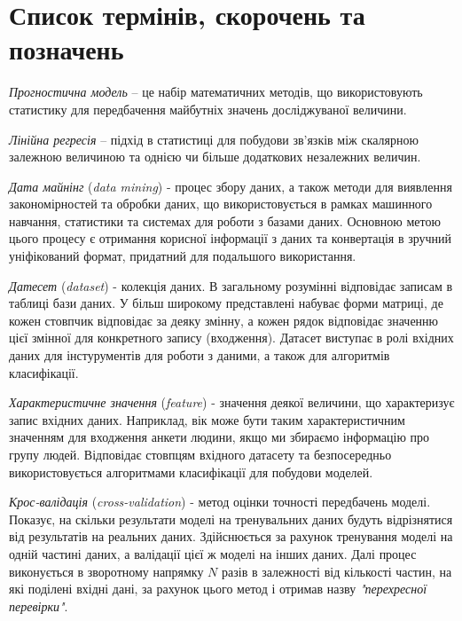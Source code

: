 \section{Список термінів, скорочень та позначень}

\textit{Прогностична модель} – це набір математичних методів, що використовують статистику для передбачення майбутніх значень досліджуваної величини. 

\textit{Лінійна регресія} – підхід в статистиці для побудови зв’язків між скалярною залежною величиною та однією чи більше додаткових незалежних величин.

\textit{Дата майнінг} (\textit{data mining}) - процес збору даних, а також методи для виявлення закономірностей та обробки даних, що використовується в рамках машинного навчання, статистики та системах для роботи з базами даних. Основною метою цього процесу є отримання корисної інформації з даних та конвертація в зручний уніфікований формат, придатний для подальшого використання.

\textit{Датесет} (\textit{dataset}) - колекція даних. В загальному розумінні відповідає записам в таблиці бази даних. У більш широкому представлені набуває форми матриці, де кожен стовпчик відповідає за деяку змінну, а кожен рядок відповідає значенню цієї змінної для конкретного запису (входження). Датасет виступає в ролі вхідних даних для інстурументів для роботи з даними, а також для алгоритмів класифікації. 

\textit{Характеристичне значення} (\textit{feature}) - значення деякої величини, що характеризує запис вхідних даних. Наприклад, вік може бути таким характеристичним значенням для входження анкети людини, якщо ми збираємо інформацію про групу людей. Відповідає стовпцям вхідного датасету та безпосередньо використовується алгоритмами класифікації для побудови моделей.

\textit{Крос-валідація} (\textit{cross-validation}) - метод оцінки точності передбачень моделі. Показує, на скільки результати моделі на тренувальних даних будуть відрізнятися від результатів на реальних даних. Здійснюється за рахунок тренування моделі на одній частині даних, а валідації цієї ж моделі на інших даних. Далі процес виконується в зворотному напрямку $N$ разів в залежності від кількості частин, на які поділені вхідні дані, за рахунок цього метод і отримав назву \textit{"перехресної перевірки"}.
